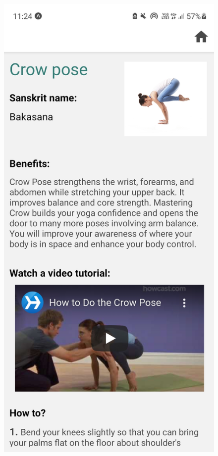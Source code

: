 \documentclass[a4paper, 12pt]{book}
\begin{document}
\begin{figure}[ht]
\begin{minipage}[b]{0.305\textwidth}
  \end{minipage}
  \begin{minipage}[b]{0.32\textwidth}
    \includegraphics[width=\textwidth]{asana.jpg}\centering

\end{minipage}
\end{figure}
\end{document}
